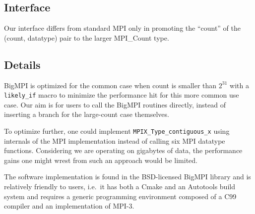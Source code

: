 \begin{comment}
The API follows the pattern of \texttt{MPI\_Type\_size(\_x)}: all BigMPI
functions are identical to their corresponding MPI ones except that
they end with \texttt{\_x} to indicate that the count arguments have the type
\texttt{MPI\_Count} instead of \texttt{int}.
BigMPI functions use the MPIX namespace because they are not in the
MPI standard.


\texttt{MPIX\_Type\_contiguous\_x}
does the heavy lifting.  It's pretty obvious how it works.
A quality datatype engine will turn this into a contiguous datatype internally 
and thus the underlying communication will be efficient.  
This approach assumes a count-safe MPI implementation, but implementations need
to be count-safe period if the Forum is serious about datatypes being
the solution rather than \texttt{MPI\_Count} everywhere.

All of the communication functions follow the same pattern, demonstrated in
Figure~\ref{code:mpi_send_x}.
\end{comment}

\subsection{Interface}

Our interface differs from standard MPI only in promoting the ``count'' 
of the (count, datatype) pair to the larger MPI\_Count type.

\subsection{Details}

BigMPI is optimized for the common case when count is smaller than $2^{31}$
with a \texttt{likely\_if} macro to minimize the performance hit for
this more common use case.  Our aim is for users to call the BigMPI routines
directly, instead of inserting a branch for the large-count case themselves.

To optimize further, one could implement
\texttt{MPIX\_Type\_contiguous\_x} using internals of the MPI implementation
instead of calling six MPI datatype functions.  Considering we are operating on
gigabytes of data, the performance gains one might wrest from such an approach
would be limited.

The software implementation is found in the BSD-licensed BigMPI
library and is relatively friendly to users, i.e.\ it has both a Cmake
and an Autotools build system and requires a generic programming
environment composed of a C99 compiler and an implementation
of MPI-3.


